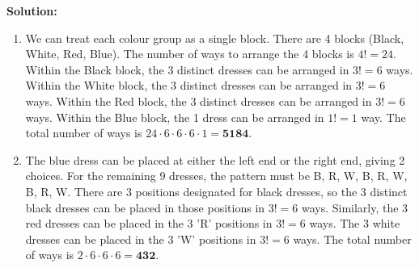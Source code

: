 \documentclass[
	letterpaper, %
	11pt, %
]{CSUniSchoolLabReport}
\begin{document}
\textbf{Solution:}
\begin{enumerate}
    \item We can treat each colour group as a single block. There are 4 blocks (Black, White, Red, Blue).
    The number of ways to arrange the 4 blocks is $4! = 24$.
    Within the Black block, the 3 distinct dresses can be arranged in $3! = 6$ ways.
    Within the White block, the 3 distinct dresses can be arranged in $3! = 6$ ways.
    Within the Red block, the 3 distinct dresses can be arranged in $3! = 6$ ways.
    Within the Blue block, the 1 dress can be arranged in $1! = 1$ way.
    The total number of ways is $24 \cdot 6 \cdot 6 \cdot 6 \cdot 1 = \textbf{5184}$.

    \item The blue dress can be placed at either the left end or the right end, giving 2 choices.
    For the remaining 9 dresses, the pattern must be B, R, W, B, R, W, B, R, W.
    There are 3 positions designated for black dresses, so the 3 distinct black dresses can be placed in those positions in $3! = 6$ ways.
    Similarly, the 3 red dresses can be placed in the 3 'R' positions in $3! = 6$ ways.
    The 3 white dresses can be placed in the 3 'W' positions in $3! = 6$ ways.
    The total number of ways is $2 \cdot 6 \cdot 6 \cdot 6 = \textbf{432}$.
\end{enumerate}
\end{document}

